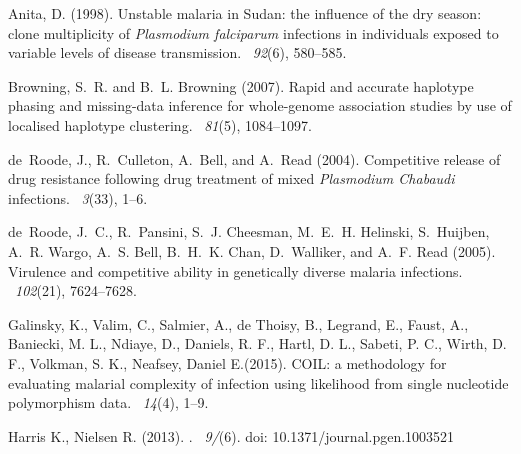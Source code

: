 \documentclass{bioinfo}
\begin{document}
\begin{thebibliography}{}

Anita, D. (1998).
\newblock Unstable malaria in Sudan: the influence of the dry season: clone
  multiplicity of {\it Plasmodium falciparum} infections in individuals exposed to
  variable levels of disease transmission.
~{\em 92\/}(6), 580--585.

Browning, S.~R. and B.~L. Browning (2007).
\newblock Rapid and accurate haplotype phasing and missing-data inference for
  whole-genome association studies by use of localised haplotype clustering.
~{\em 81\/}(5), 1084--1097.

de~Roode, J., R.~Culleton, A.~Bell, and A.~Read (2004).
\newblock Competitive release of drug resistance following drug treatment of
  mixed {\it Plasmodium Chabaudi} infections.
~{\em 3\/}(33), 1--6.

de~Roode, J.~C., R.~Pansini, S.~J. Cheesman, M.~E.~H. Helinski, S.~Huijben,
  A.~R. Wargo, A.~S. Bell, B.~H.~K. Chan, D.~Walliker, and A.~F. Read (2005).
\newblock Virulence and competitive ability in genetically diverse malaria
  infections.
~{\em 102\/}(21), 7624--7628.

Galinsky, K., Valim, C., Salmier, A., de Thoisy, B., Legrand, E., Faust, A., Baniecki, M. L., Ndiaye, D., Daniels, R. F., Hartl, D. L., Sabeti, P. C., Wirth, D. F., Volkman, S. K., Neafsey, Daniel E.(2015).
\newblock COIL: a methodology for evaluating malarial complexity of infection using likelihood from single nucleotide polymorphism data.
~{\em14\/}(4), 1--9.

Harris K., Nielsen R. (2013).
. 
~{\em9/}(6). doi: 10.1371/journal.pgen.1003521


\end{thebibliography}
\end{document}
